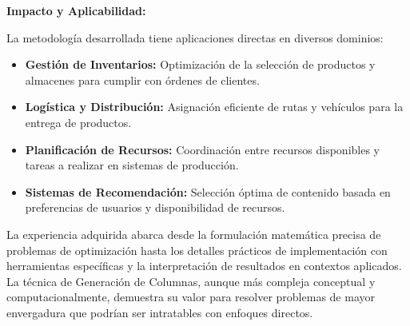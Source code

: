 \documentclass[a4paper,12pt]{article}
\begin{document}
\textbf{Impacto y Aplicabilidad:}

La metodología desarrollada tiene aplicaciones directas en diversos dominios:
\begin{itemize}
    \item \textbf{Gestión de Inventarios:} Optimización de la selección de productos y almacenes para cumplir con órdenes de clientes.
    \item \textbf{Logística y Distribución:} Asignación eficiente de rutas y vehículos para la entrega de productos.
    \item \textbf{Planificación de Recursos:} Coordinación entre recursos disponibles y tareas a realizar en sistemas de producción.
    \item \textbf{Sistemas de Recomendación:} Selección óptima de contenido basada en preferencias de usuarios y disponibilidad de recursos.
\end{itemize}

La experiencia adquirida abarca desde la formulación matemática precisa de problemas de optimización hasta los detalles prácticos de implementación con herramientas específicas y la interpretación de resultados en contextos aplicados. La técnica de Generación de Columnas, aunque más compleja conceptual y computacionalmente, demuestra su valor para resolver problemas de mayor envergadura que podrían ser intratables con enfoques directos.
\end{document}
